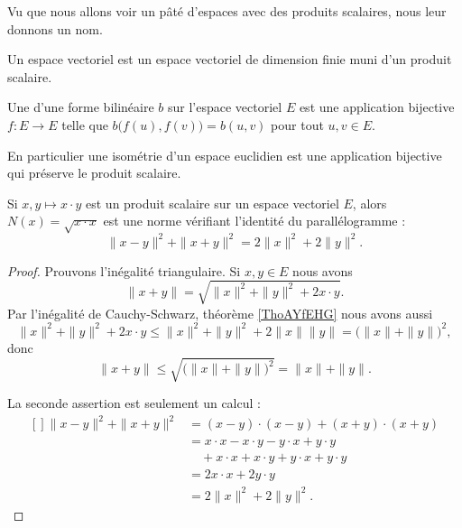 Vu que nous allons voir un pâté d'espaces avec des produits scalaires, nous leur donnons un nom.
\begin{definition}\label{DefLZMcvfj}
    Un espace vectoriel  est un espace vectoriel de dimension finie muni d'un produit scalaire.
\end{definition}

\begin{definition}      \label{DEFooGGTYooXsHIZj}
    Une  d'une forme bilinéaire \( b\) sur l'espace vectoriel \( E\) est une application bijective \( f\colon E\to E\) telle que \( b\big( f(u),f(v) \big)=b(u,v)\) pour tout \( u,v\in E\).
\end{definition}
En particulier une isométrie d'un espace euclidien est une application bijective qui préserve le produit scalaire.

\begin{proposition} \label{PropEQRooQXazLz}
    Si \( x,y\mapsto x\cdot y\) est un produit scalaire sur un espace vectoriel \( E\), alors \( N(x)=\sqrt{x\cdot x}\) est une norme vérifiant l'identité du parallélogramme :
    \begin{equation}        \label{EqYCLtWfJ}
        \| x-y \|^2+\| x+y \|^2=2\| x \|^2+2\| y \|^2.
    \end{equation}
\end{proposition}

\begin{proof}

    Prouvons l'inégalité triangulaire. Si \( x,y\in E\) nous avons
    \begin{equation}
        \| x+y \|=\sqrt{\| x \|^2+\| y \|^2+2x\cdot y}.
    \end{equation}
    Par l'inégalité de Cauchy-Schwarz, théorème \ref{ThoAYfEHG} nous avons aussi
    \begin{equation}
        \| x \|^2+\| y \|^2+2x\cdot y\leq \| x \|^2+\| y \|^2+2\| x \|\| y \|=\big( \| x \|+\| y \| \big)^2,
    \end{equation}
    donc
    \begin{equation}
        \| x+y \|\leq \sqrt{\big( \| x \|+\| y \| \big)^2}=\| x \|+\| y \|.
    \end{equation}

    La seconde assertion est seulement un calcul :
			\begin{equation}
				\begin{aligned}[]
					\| x-y \|^2+\| x+y \|^2&=(x-y)\cdot (x-y)+(x+y)\cdot(x+y)\\
					&=x\cdot x-x\cdot y-y\cdot x+y\cdot y\\
					&\quad +x\cdot x+x\cdot y+y\cdot x+y\cdot y\\
					&=2x\cdot x+2y\cdot y\\
					&=2\| x \|^2+2\| y \|^2.
				\end{aligned}
			\end{equation}
\end{proof}

